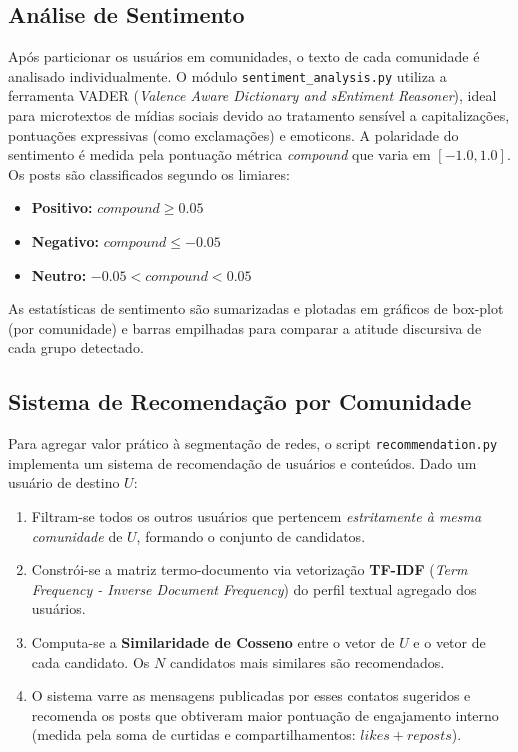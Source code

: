 \documentclass[12pt,a4paper]{article}
\begin{document}
\subsection{Análise de Sentimento}
Após particionar os usuários em comunidades, o texto de cada comunidade é analisado individualmente. O módulo \texttt{sentiment\_analysis.py} utiliza a ferramenta VADER (\textit{Valence Aware Dictionary and sEntiment Reasoner}), ideal para microtextos de mídias sociais devido ao tratamento sensível a capitalizações, pontuações expressivas (como exclamações) e emoticons. A polaridade do sentimento é medida pela pontuação métrica \textit{compound} que varia em $[-1.0, 1.0]$. Os posts são classificados segundo os limiares:
\begin{itemize}
    \item \textbf{Positivo:} $compound \geq 0.05$
    \item \textbf{Negativo:} $compound \leq -0.05$
    \item \textbf{Neutro:} $-0.05 < compound < 0.05$
\end{itemize}
As estatísticas de sentimento são sumarizadas e plotadas em gráficos de box-plot (por comunidade) e barras empilhadas para comparar a atitude discursiva de cada grupo detectado.

\subsection{Sistema de Recomendação por Comunidade}
Para agregar valor prático à segmentação de redes, o script \texttt{recommendation.py} implementa um sistema de recomendação de usuários e conteúdos. Dado um usuário de destino $U$:
\begin{enumerate}
    \item Filtram-se todos os outros usuários que pertencem \textit{estritamente à mesma comunidade} de $U$, formando o conjunto de candidatos.
    \item Constrói-se a matriz termo-documento via vetorização \textbf{TF-IDF} (\textit{Term Frequency - Inverse Document Frequency}) do perfil textual agregado dos usuários.
    \item Computa-se a \textbf{Similaridade de Cosseno} entre o vetor de $U$ e o vetor de cada candidato. Os $N$ candidatos mais similares são recomendados.
    \item O sistema varre as mensagens publicadas por esses contatos sugeridos e recomenda os posts que obtiveram maior pontuação de engajamento interno (medida pela soma de curtidas e compartilhamentos: $likes + reposts$).
\end{enumerate}
\end{document}
